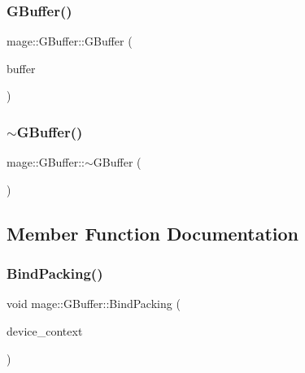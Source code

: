 \subsubsection{\texorpdfstring{G\+Buffer()}{GBuffer()}\hspace{0.1cm}{\footnotesize\ttfamily [4/4]}}
{\footnotesize\ttfamily mage\+::\+G\+Buffer\+::\+G\+Buffer (\begin{DoxyParamCaption}\item[{\hyperlink{structmage_1_1_g_buffer}{G\+Buffer} \&\&}]{buffer }\end{DoxyParamCaption})\hspace{0.3cm}{\ttfamily [default]}}

\hypertarget{structmage_1_1_g_buffer_ace75566b38462d7edd1299379e418318}{}\label{structmage_1_1_g_buffer_ace75566b38462d7edd1299379e418318} 
\subsubsection{\texorpdfstring{$\sim$\+G\+Buffer()}{~GBuffer()}}
{\footnotesize\ttfamily mage\+::\+G\+Buffer\+::$\sim$\+G\+Buffer (\begin{DoxyParamCaption}{ }\end{DoxyParamCaption})\hspace{0.3cm}{\ttfamily [default]}}



\subsection{Member Function Documentation}
\hypertarget{structmage_1_1_g_buffer_a90645118643a60f597741ebb319eb077}{}\label{structmage_1_1_g_buffer_a90645118643a60f597741ebb319eb077} 
\subsubsection{\texorpdfstring{Bind\+Packing()}{BindPacking()}}
{\footnotesize\ttfamily void mage\+::\+G\+Buffer\+::\+Bind\+Packing (\begin{DoxyParamCaption}\item[{I\+D3\+D11\+Device\+Context2 $\ast$}]{device\+\_\+context }\end{DoxyParamCaption})\hspace{0.3cm}{\ttfamily [noexcept]}}

